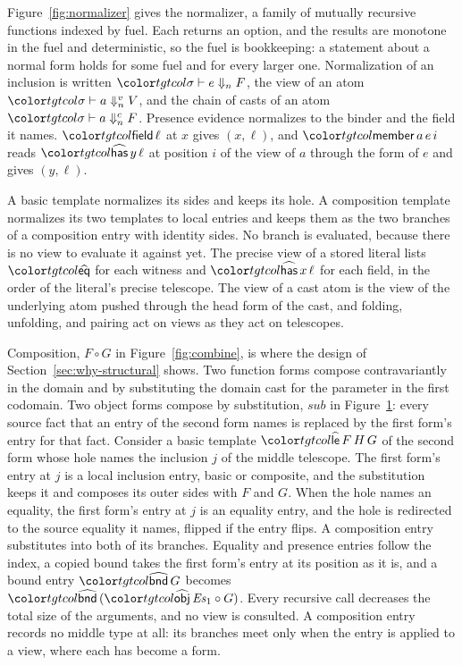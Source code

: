 \begin{figure}
\label{fig:form-ops}
\end{figure}

Figure~\ref{fig:normalizer} gives the normalizer, a family of mutually recursive functions indexed by fuel. Each returns an option, and the results are monotone in the fuel and deterministic, so the fuel is bookkeeping: a statement about a normal form holds for some fuel and for every larger one. Normalization of an inclusion is written $\hnf{\sigma}{e}{n}{F}$, the view of an atom $\vw{\sigma}{a}{n}{V}$, and the chain of casts of an atom $\chn{\sigma}{a}{n}{F}$. Presence evidence normalizes to the binder and the field it names. $\ev{field}\,\ell$ at $x$ gives $(x, \ell)$, and $\ev{member}\,a\,e\,i$ reads $\form{has}\,y\,\ell$ at position $i$ of the view of $a$ through the form of $e$ and gives $(y, \ell)$.

A basic template normalizes its sides and keeps its hole. A composition template normalizes its two templates to local entries and keeps them as the two branches of a composition entry with identity sides. No branch is evaluated, because there is no view to evaluate it against yet. The precise view of a stored literal lists $\form{eq}$ for each witness and $\form{has}\,x\,\ell$ for each field, in the order of the literal's precise telescope. The view of a cast atom is the view of the underlying atom pushed through the head form of the cast, and folding, unfolding, and pairing act on views as they act on telescopes.

Composition, $F \circ G$ in Figure~\ref{fig:combine}, is where the design of Section~\ref{sec:why-structural} shows. Two function forms compose contravariantly in the domain and by substituting the domain cast for the parameter in the first codomain. Two object forms compose by substitution, $\mathit{sub}$ in Figure~\ref{fig:form-ops}: every source fact that an entry of the second form names is replaced by the first form's entry for that fact. Consider a basic template $\form{le}\,F\,H\,G$ of the second form whose hole names the inclusion $j$ of the middle telescope. The first form's entry at $j$ is a local inclusion entry, basic or composite, and the substitution keeps it and composes its outer sides with $F$ and $G$. When the hole names an equality, the first form's entry at $j$ is an equality entry, and the hole is redirected to the source equality it names, flipped if the entry flips. A composition entry substitutes into both of its branches. Equality and presence entries follow the index, a copied bound takes the first form's entry at its position as it is, and a bound entry $\form{bnd}\,G$ becomes $\form{bnd}\,(\form{obj}\,\mathit{Es}_1 \circ G)$. Every recursive call decreases the total size of the arguments, and no view is consulted. A composition entry records no middle type at all: its branches meet only when the entry is applied to a view, where each has become a form.

